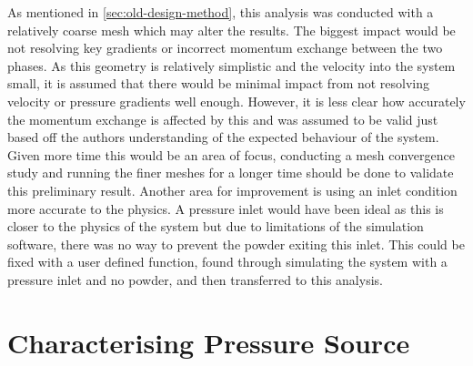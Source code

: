 As mentioned in \autoref{sec:old-design-method}, this analysis was conducted with a relatively coarse mesh which may alter the results. The biggest impact would be not resolving key gradients or incorrect momentum exchange between the two phases. As this geometry is relatively simplistic and the velocity into the system small, it is assumed that there would be minimal impact from not resolving velocity or pressure gradients well enough. However, it is less clear how accurately the momentum exchange is affected by this and was assumed to be valid just based off the authors understanding of the expected behaviour of the system. Given more time this would be an area of focus, conducting a mesh convergence study and running the finer meshes for a longer time should be done to validate this preliminary result. Another area for improvement is using an inlet condition more accurate to the physics. A pressure inlet would have been ideal as this is closer to the physics of the system but due to limitations of the simulation software, there was no way to prevent the powder exiting this inlet. This could be fixed with a user defined function, found through simulating the system with a pressure inlet and no powder, and then transferred to this analysis.
\section{Characterising Pressure Source}\label{sec:static_test}
